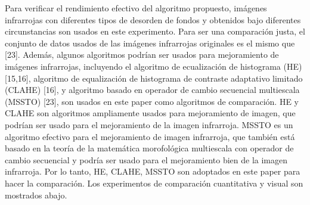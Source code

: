 \documentclass[a4paper, 11 pt, conference]{ieeeconf}      %
\begin{document}
Para verificar el rendimiento efectivo del algoritmo propuesto, im\'agenes infrarrojas con diferentes tipos de desorden de fondos y obtenidos bajo diferentes circunstancias son usados en este experimento. Para ser una comparaci\'on justa, el conjunto de datos usados de las im\'agenes infrarrojas originales es el mismo que [23]. Adem\'as, algunos algoritmos podr\'ian ser usados para mejoramiento de im\'agenes infrarrojas, incluyendo el algoritmo de ecualizaci\'on de histograma (HE)[15,16], algoritmo de equalizaci\'on  de histograma de contraste adaptativo limitado (CLAHE) [16],  y algoritmo basado en operador de cambio secuencial multiescala (MSSTO) [23], son usados en este paper como algoritmos de comparaci\'on. HE y CLAHE son algoritmos ampliamente usados para mejoramiento de imagen, que podr\'ian ser usado para el mejoramiento de la imagen infrarroja. MSSTO es un algoritmo efectivo para el mejoramiento de imagen infrarroja, que tambi\'en est\'a basado en la teor\'ia de la matem\'atica morofol\'ogica multiescala con operador de cambio secuencial y podr\'ia ser usado para el mejoramiento bien de la imagen infrarroja. Por lo tanto, HE, CLAHE, MSSTO son adoptados en este paper para hacer la comparaci\'on. Los experimentos de comparaci\'on cuantitativa y visual son mostrados abajo.
\end{document}
